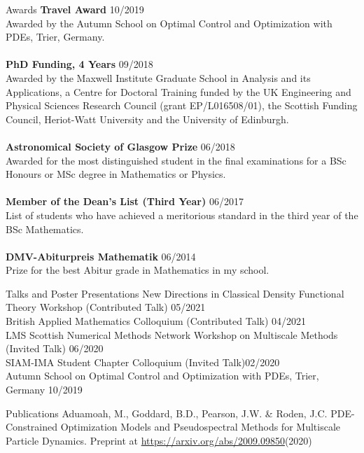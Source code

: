 \documentclass{resume} %
\begin{document}
\begin{rSection}{Awards}
	{\bf Travel Award}   \hfill{10/2019}	\\
	Awarded by the Autumn School on Optimal Control and Optimization with PDEs, Trier, Germany. \\
	\\
	{\bf PhD Funding, 4 Years} \hfill{09/2018}\\	
	Awarded by the Maxwell Institute Graduate School in Analysis and its Applications, a Centre for Doctoral Training funded by the UK Engineering and Physical Sciences Research Council (grant EP/L016508/01), the Scottish Funding Council, Heriot-Watt University and the University of Edinburgh.\\
	\\
	{\bf Astronomical Society of Glasgow Prize} \hfill{06/2018}\\ 
	Awarded for the most distinguished student in the final examinations for a BSc Honours or MSc degree in Mathematics or Physics.\\
	\\
	{\bf Member of the Dean’s List (Third Year)} \hfill{06/2017}\\
	List of students who have achieved a meritorious standard in the third year of the BSc Mathematics.
	\\
	\\
	{\bf DMV-Abiturpreis Mathematik} \hfill{06/2014}\\
	Prize for the best Abitur grade in Mathematics in my school.
\end{rSection}



\begin{rSection}{Talks and Poster Presentations}
	New Directions in Classical Density Functional Theory Workshop (Contributed Talk) \hfill{05/2021}\\
	British Applied Mathematics Colloquium (Contributed Talk) \hfill{04/2021}\\
	LMS Scottish Numerical Methods Network Workshop on Multiscale Methods (Invited Talk)  \hfill{06/2020}\\
	SIAM-IMA Student Chapter Colloquium (Invited Talk)\hfill{02/2020}\\
	Autumn School on Optimal Control and Optimization with PDEs, Trier, Germany \hfill{10/2019}
	
	
\end{rSection}
\begin{rSection}{Publications}
	Aduamoah, M., Goddard, B.D., Pearson, J.W. \& Roden, J.C. PDE-Constrained Optimization Models and Pseudospectral Methods for Multiscale Particle Dynamics. Preprint at \url{https://arxiv.org/abs/2009.09850}(2020)
\end{rSection}	
	
\end{document}
